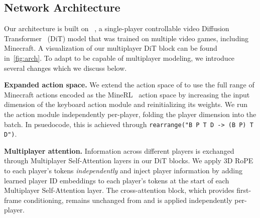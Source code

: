 \subsection{Network Architecture}
\label{subsec:model_architecture}

Our architecture is built on \matrixgame~\cite{he2025matrixgame20opensourcerealtime}, a single-player controllable video Diffusion Transformer~\cite{peebles2023scalablediffusionmodelstransformers} (DiT) model that was trained on multiple video games, including Minecraft. A visualization of our multiplayer DiT block can be found in~\cref{fig:arch}. To adapt \matrixgame to be capable of multiplayer modeling, we introduce several changes which we discuss below. 

\textbf{Expanded action space.} We extend the action space of \matrixgame to use the full range of Minecraft actions encoded as the MineRL~\cite{guss2019minerllargescaledatasetminecraft} action space by increasing the input dimension of the \matrixgame keyboard action module and reinitializing its weights. We run the action module independently per-player, folding the player dimension into the batch. In psuedocode, this is achieved through \texttt{rearrange("B P T D -> (B P) T D")}.  

\textbf{Multiplayer attention.} Information across different players is exchanged through Multiplayer Self-Attention layers in our DiT blocks. We apply 3D RoPE~\cite{su2024roformer} to each player's tokens \textit{independently} and inject player information by adding learned player ID embeddings to each player's tokens at the start of each Multiplayer Self-Attention layer. The cross-attention block, which provides first-frame conditioning, remains unchanged from \matrixgame and is applied independently per-player. 
